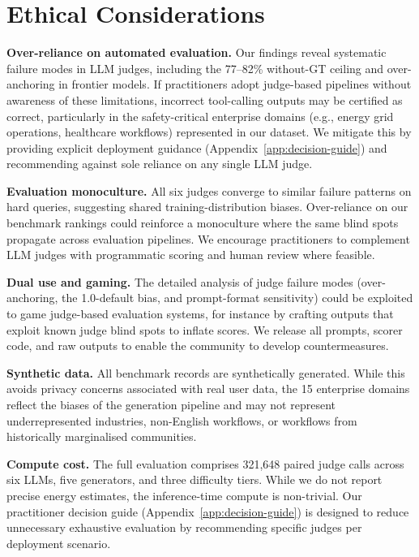 \section*{Ethical Considerations}

\textbf{Over-reliance on automated evaluation.}
Our findings reveal systematic failure modes in LLM judges,
including the 77--82\% without-GT ceiling and over-anchoring
in frontier models. If practitioners adopt judge-based
pipelines without awareness of these limitations, incorrect
tool-calling outputs may be certified as correct, particularly
in the safety-critical enterprise domains (e.g., energy grid
operations, healthcare workflows) represented in our dataset.
We mitigate this by providing explicit deployment guidance
(Appendix~\ref{app:decision-guide}) and recommending
against sole reliance on any single LLM judge.

\textbf{Evaluation monoculture.} All six judges converge to
similar failure patterns on hard queries, suggesting shared
training-distribution biases. Over-reliance on our benchmark
rankings could reinforce a monoculture where the same blind
spots propagate across evaluation pipelines. We encourage
practitioners to complement LLM judges with programmatic
scoring and human review where feasible.

\textbf{Dual use and gaming.} The detailed analysis of judge
failure modes (over-anchoring, the 1.0-default bias, and
prompt-format sensitivity) could be exploited to game
judge-based evaluation systems, for instance by crafting
outputs that exploit known judge blind spots to inflate
scores. We release all prompts, scorer code, and raw
outputs to enable the community to develop countermeasures.

\textbf{Synthetic data.} All benchmark records are
synthetically generated. While this avoids privacy concerns
associated with real user data, the 15 enterprise domains
reflect the biases of the generation pipeline and may not
represent underrepresented industries, non-English workflows,
or workflows from historically marginalised communities.

\textbf{Compute cost.} The full evaluation comprises 321,648
paired judge calls across six LLMs, five generators, and
three difficulty tiers. While we do not report precise energy
estimates, the inference-time compute is non-trivial. Our
practitioner decision guide (Appendix~\ref{app:decision-guide})
is designed to reduce unnecessary exhaustive evaluation by
recommending specific judges per deployment scenario.